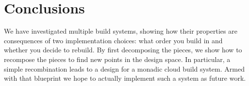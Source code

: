 \section{Conclusions}\label{sec-conclusions}

We have investigated multiple build systems, showing how their properties are consequences of two implementation choices: what order you build in and whether you decide to rebuild. By first decomposing the pieces, we show how to recompose the pieces to find new points in the design space. In particular, a simple recombination leads to a design for a monadic cloud build system. Armed with that blueprint we hope to actually implement such a system as future work.
